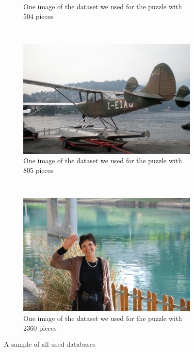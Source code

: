 \documentclass[]{report}
\begin{document}
\begin{figure}
\begin{subfigure}[b]{0.45\textwidth}
		\caption{One image of the dataset we used for the puzzle with 504 pieces}
		\label{img:540}
	\end{subfigure}
	~
	\begin{subfigure}[b]{0.45\textwidth}
		\includegraphics[width=\textwidth]{../imData/805/1.jpg}
		\caption{One image of the dataset we used for the puzzle with 805 pieces}
		\label{img:805}
	\end{subfigure}
	~
	\begin{subfigure}[b]{0.45\textwidth}
		\includegraphics[width=\textwidth]{../imData/2360/1.jpg}
		\caption{One image of the dataset we used for the puzzle with 2360 pieces}
		\label{img:2360}
	\end{subfigure}

	\caption{A sample of all used databases}
	\label{fig:database}
\end{figure}
\end{document}
